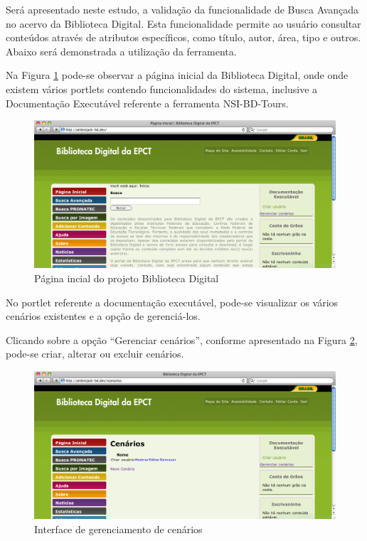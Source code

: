 Será apresentado neste estudo, a validação da funcionalidade de Busca Avançada no acervo da Biblioteca Digital. Esta funcionalidade permite ao usuário consultar conteúdos através de atributos específicos, como título, autor, área, tipo e outros. Abaixo será demonstrada a utilização da ferramenta.

Na Figura \ref{tour_1} pode-se observar a página inicial da Biblioteca Digital, onde onde existem vários portlets contendo funcionalidades do sistema, inclusive a Documentação Executável referente a ferramenta NSI-BD-Tours.

\begin{figure}[ht]
    \centering
    \includegraphics[width=0.9 \textwidth]{figuras/tour_1}
    \caption{Página incial do projeto Biblioteca Digital}
    \label{tour_1}
\end{figure}

No portlet referente a documentação executável, pode-se visualizar os vários cenários existentes e a opção de gerenciá-los.

\pagebreak
Clicando sobre a opção “Gerenciar cenários”, conforme apresentado na Figura \ref{tour_2}, pode-se criar, alterar ou excluir cenários.

\begin{figure}[ht]
    \centering
    \includegraphics[width=0.9 \textwidth]{figuras/tour_2}
    \caption{Interface de gerenciamento de cenários}
    \label{tour_2}
\end{figure}

